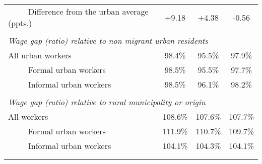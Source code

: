 \begin{tabular}{lccc}
~~~~~Difference from the urban average (ppts.) & +9.18  & +4.38 & -0.56 \\
      &       &       &  \\
\multicolumn{4}{l}{\textit{Wage gap (ratio) relative to non-migrant urban residents}} \\
All urban workers & 98.4\% & 95.5\% & 97.9\% \\
~~~~~Formal urban workers & 98.5\% & 95.5\% & 97.7\% \\
~~~~~Informal urban workers & 98.5\% & 96.1\% & 98.2\% \\
      &       &       &  \\
\multicolumn{4}{l}{\textit{Wage gap (ratio) relative to rural municipality or origin}} \\
All workers & 108.6\% & 107.6\% & 107.7\% \\
~~~~~Formal urban workers & 111.9\% & 110.7\% & 109.7\% \\
~~~~~Informal urban workers & 104.1\% & 104.3\% & 104.1\% \\
      &       &       &  \\
\bottomrule &       &       &  \\
\end{tabular}%
